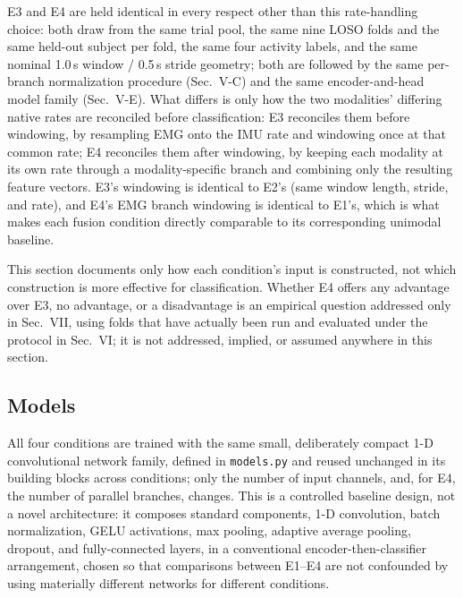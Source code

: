 \documentclass[conference]{IEEEtran}
\begin{document}
E3 and E4 are held identical in every respect other than this
rate-handling choice: both draw from the same trial pool, the same
nine LOSO folds and the same held-out subject per fold, the same
four activity labels, and the same nominal 1.0\,s window / 0.5\,s
stride geometry; both are followed by the same per-branch
normalization procedure (Sec.~V-C) and the same encoder-and-head
model family (Sec.~V-E). What differs is only how the two
modalities' differing native rates are reconciled before
classification: E3 reconciles them before windowing, by resampling
EMG onto the IMU rate and windowing once at that common rate; E4
reconciles them after windowing, by keeping each modality at its own
rate through a modality-specific branch and combining only the
resulting feature vectors. E3's windowing is identical to E2's
(same window length, stride, and rate), and E4's EMG branch
windowing is identical to E1's, which is what makes each fusion
condition directly comparable to its corresponding unimodal
baseline.

This section documents only how each condition's input is
constructed, not which construction is more effective for
classification. Whether E4 offers any advantage over E3, no
advantage, or a disadvantage is an empirical question addressed only
in Sec.~VII, using folds that have actually been run and evaluated
under the protocol in Sec.~VI; it is not addressed, implied, or
assumed anywhere in this section.

\subsection{Models}
\label{subsec:models}

All four conditions are trained with the same small, deliberately
compact 1-D convolutional network family, defined in
\texttt{models.py} and reused unchanged in its building blocks
across conditions; only the number of input channels, and, for E4,
the number of parallel branches, changes. This is a controlled
baseline design, not a novel architecture: it composes standard
components, 1-D convolution, batch normalization, GELU activations,
max pooling, adaptive average pooling, dropout, and fully-connected
layers, in a conventional encoder-then-classifier arrangement,
chosen so that comparisons between E1--E4 are not confounded by
using materially different networks for different conditions.
\end{document}
